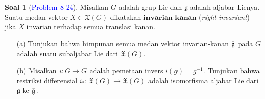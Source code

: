 \documentclass[11pt]{article}
\theoremstyle{definition}
\newtheorem*{problem}{Soal}
\theoremstyle{remark}
\begin{document}
\begin{problem}[\textcolor{blue}{Problem 8-24}]
Misalkan $G$ adalah grup Lie dan $\mathfrak{g}$ adalah aljabar Lienya. Suatu medan vektor $X \in \mathfrak{X}(G)$ dikatakan $\textbf{invarian-kanan}$ (\textit{right-invariant}) jika $X$ invarian terhadap semua translasi kanan.
\begin{itemize}
    \item [(a)] Tunjukan bahwa himpunan semua medan vektor invarian-kanan $\Bar{\mathfrak{g}}$ pada $G$ adalah suatu subaljabar Lie dari $\mathfrak{X}(G)$.
    
    \item [(b)] Misalkan $i : G \to G$ adalah pemetaan invers $i(g)=g^{-1}$. Tunjukan bahwa restriksi differensial $i_{*} : \mathfrak{X}(G) \to \mathfrak{X}(G)$ adalah isomorfisma aljabar Lie dari $\mathfrak{g}$ ke $\Bar{\mathfrak{g}}$. 
\end{itemize}
\end{problem}
\end{document}
